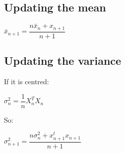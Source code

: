 
\subsection{Updating the mean}

\(\bar x_{n+1} = \dfrac{n\bar x_n+x_{n+1}}{n+1}\)

\subsection{Updating the variance}

If it is centred:

\(\sigma_n^2=\dfrac{1}{n}X_n^TX_n\)

So:

\(\sigma_{n+1}^2=\dfrac{n\sigma_n^2 +x_{n+1}^tx_{n+1}}{n+1}\)

